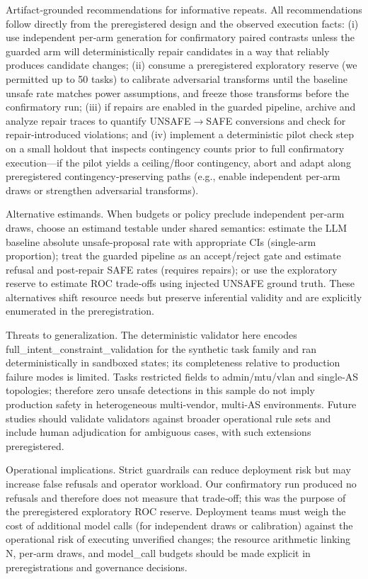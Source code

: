 \documentclass[conference]{IEEEtran}
\begin{document}
Artifact‑grounded recommendations for informative repeats. All recommendations follow directly from the preregistered design and the observed execution facts: (i) use independent per‑arm generation for confirmatory paired contrasts unless the guarded arm will deterministically repair candidates in a way that reliably produces candidate changes; (ii) consume a preregistered exploratory reserve (we permitted up to 50 tasks) to calibrate adversarial transforms until the baseline unsafe rate matches power assumptions, and freeze those transforms before the confirmatory run; (iii) if repairs are enabled in the guarded pipeline, archive and analyze repair traces to quantify UNSAFE\ensuremath{\rightarrow}SAFE conversions and check for repair‑introduced violations; and (iv) implement a deterministic pilot check step on a small holdout that inspects contingency counts prior to full confirmatory execution---if the pilot yields a ceiling/floor contingency, abort and adapt along preregistered contingency‑preserving paths (e.g., enable independent per‑arm draws or strengthen adversarial transforms).

Alternative estimands. When budgets or policy preclude independent per‑arm draws, choose an estimand testable under shared semantics: estimate the LLM baseline absolute unsafe‑proposal rate with appropriate CIs (single‑arm proportion); treat the guarded pipeline as an accept/reject gate and estimate refusal and post‑repair SAFE rates (requires repairs); or use the exploratory reserve to estimate ROC trade‑offs using injected UNSAFE ground truth. These alternatives shift resource needs but preserve inferential validity and are explicitly enumerated in the preregistration.

Threats to generalization. The deterministic validator here encodes full\_intent\_constraint\_validation for the synthetic task family and ran deterministically in sandboxed states; its completeness relative to production failure modes is limited. Tasks restricted fields to admin/mtu/vlan and single‑AS topologies; therefore zero unsafe detections in this sample do not imply production safety in heterogeneous multi‑vendor, multi‑AS environments. Future studies should validate validators against broader operational rule sets and include human adjudication for ambiguous cases, with such extensions preregistered.

Operational implications. Strict guardrails can reduce deployment risk but may increase false refusals and operator workload. Our confirmatory run produced no refusals and therefore does not measure that trade‑off; this was the purpose of the preregistered exploratory ROC reserve. Deployment teams must weigh the cost of additional model calls (for independent draws or calibration) against the operational risk of executing unverified changes; the resource arithmetic linking N, per‑arm draws, and model\_call budgets should be made explicit in preregistrations and governance decisions.
\end{document}
